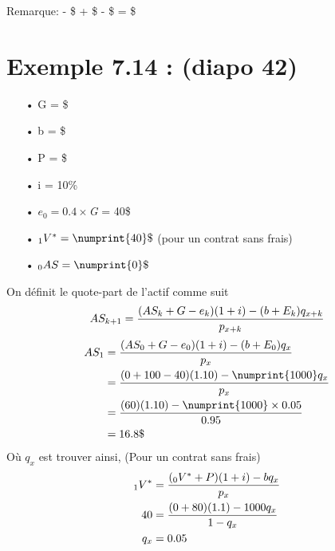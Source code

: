 \documentclass[11pt,french]{report}
\newcommand{\indiceGauche}[2]{{\vphantom{#2}}_{#1}#2}
\begin{document}
Remarque: - \$ + \$ - \$ = \$


\section{Exemple 7.14 : (diapo 42)}
\begin{itemize}
\item[•] G = \$
\item[•] b = \$
\item[•] P = \$
\item[•] i = 10\%
\item[•] $e_0 = 0.4 \times $\textit{G} = 40\$
\item[•] $\indiceGauche{1}{V}^{*} = \numprint{40}\$$ (pour un contrat sans frais)
\item[•] $\indiceGauche{0}{AS} = \numprint{0}\$ $
\end{itemize}
On définit le quote-part de l'actif comme suit 
\begin{equation}
\label{equationLquote-part}
AS_{k+1} = \frac{(AS_{k} + G - e_{k}) (1 + i) - (b + E_{k}) q_{x+k}}{p_{x+k}} \\
\end{equation}
\begin{align*}
AS_{1} &= \frac{(AS_{0} + G - e_{0}) (1 + i) - (b + E_{0}) q_{x}}{p_{x}} \\
&= \frac{(0+100-40) (1.10) - \numprint{1000}q_{x}}{p_{x}} \\
&= \frac{(60) (1.10) - \numprint{1000} \times 0.05}{0.95} \\
&=16.8\$
\end{align*}
Où $q_{x}$ est trouver ainsi, (Pour un contrat sans frais)
\begin{align*}
\indiceGauche{1}{V}^{*} &= \frac{(\indiceGauche{0}{V}^{*}+P)(1+i) - b q_{x}}{p_{x}} \\
40 &= \frac{(0+80)(1.1) - 1000 q_{x}}{1 - q_{x}} \\
q_{x} & = 0.05
\end{align*}
\end{document}
